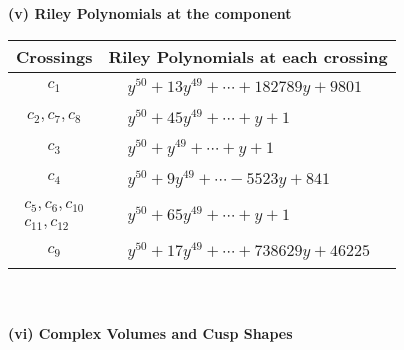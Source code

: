 \documentclass[1p]{elsarticle_modified}
\theoremstyle{definition}
\begin{document}
\newpage\renewcommand{\arraystretch}{1}
\flushleft \textbf{(v) Riley Polynomials at the component}\newline \\
\begin{tabular}{m{50pt}|m{274pt}}
Crossings & \hspace{64pt}Riley Polynomials at each crossing \\
\hline $$\begin{aligned}c_{1}\end{aligned}$$&$\begin{aligned}
&y^{50}+13 y^{49}+\cdots+182789 y+9801
\end{aligned}$\\
\hline $$\begin{aligned}c_{2},c_{7},c_{8}\end{aligned}$$&$\begin{aligned}
&y^{50}+45 y^{49}+\cdots+y+1
\end{aligned}$\\
\hline $$\begin{aligned}c_{3}\end{aligned}$$&$\begin{aligned}
&y^{50}+y^{49}+\cdots+y+1
\end{aligned}$\\
\hline $$\begin{aligned}c_{4}\end{aligned}$$&$\begin{aligned}
&y^{50}+9 y^{49}+\cdots-5523 y+841
\end{aligned}$\\
\hline $$\begin{aligned}c_{5},c_{6},c_{10}\\c_{11},c_{12}\end{aligned}$$&$\begin{aligned}
&y^{50}+65 y^{49}+\cdots+y+1
\end{aligned}$\\
\hline $$\begin{aligned}c_{9}\end{aligned}$$&$\begin{aligned}
&y^{50}+17 y^{49}+\cdots+738629 y+46225
\end{aligned}$\\
\hline
\end{tabular}\\~\\
\newpage\flushleft \textbf{(vi) Complex Volumes and Cusp Shapes}
\end{document}
